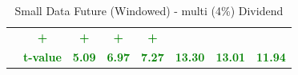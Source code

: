 \documentclass[11pt,english,a4paper,hidelinks]{book}
\begin{document}
\begin{table}[H]
\begin{tabular}{lccccccc}
                     & \textbf{\textcolor{green}{+}}
                     & \textbf{\textcolor{green}{+}}
                     & \textbf{\textcolor{green}{+}}
                     & \textbf{\textcolor{green}{+}} \\
            & \textbf{\textcolor{green}{t-value}}
                     & \textbf{\textcolor{green}{5.09}}
                     & \textbf{\textcolor{green}{6.97}}
                     & \textbf{\textcolor{green}{7.27}}
                     & \textbf{\textcolor{green}{13.30}}
                     & \textbf{\textcolor{green}{13.01}}
                     & \textbf{\textcolor{green}{11.94}} \\
        \bottomrule
    \end{tabular}
    \caption{Small Data Future (Windowed) - \acrshort{multi} (4\%) Dividend}
    \label{tab:dividend_windowed_reformat}
\end{table}
\end{document}
